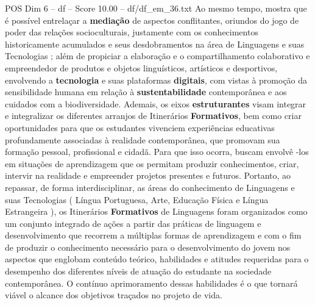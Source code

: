 \begin{textsample}{POS Dim 6 – df – Score 10.00 – df/df\_em\_36.txt}
Ao mesmo tempo, mostra que é possível entrelaçar a \textbf{mediação} de aspectos conflitantes, oriundos do jogo de poder das relações socioculturais, justamente com os conhecimentos historicamente acumulados e seus desdobramentos na área de Linguagens e suas Tecnologias ; além de propiciar a elaboração e o compartilhamento colaborativo e empreendedor de produtos e objetos linguísticos, artísticos e desportivos, envolvendo a \textbf{tecnologia} e suas plataformas \textbf{digitais}, com vistas à promoção da sensibilidade humana em relação à \textbf{sustentabilidade} contemporânea e aos cuidados com a biodiversidade.
Ademais, os eixos \textbf{estruturantes} visam integrar e integralizar os diferentes arranjos de Itinerários \textbf{Formativos}, bem como criar oportunidades para que os estudantes vivenciem experiências educativas profundamente associadas à realidade contemporânea, que promovam sua formação pessoal, profissional e cidadã.
Para que isso ocorra, buscam envolvê -los em situações de aprendizagem que os permitam produzir conhecimentos, criar, intervir na realidade e empreender projetos presentes e futuros.
Portanto, ao repassar, de forma interdisciplinar, as áreas do conhecimento de Linguagens e suas Tecnologias ( Língua Portuguesa, Arte, Educação Física e Língua Estrangeira ), os Itinerários \textbf{Formativos} de Linguagens foram organizados como um conjunto integrado de ações a partir das práticas de linguagem e desenvolvimento que recorrem a múltiplas formas de aprendizagem e com o fim de produzir o conhecimento necessário para o desenvolvimento do jovem nos aspectos que englobam conteúdo teórico, habilidades e atitudes requeridas para o desempenho dos diferentes níveis de atuação do estudante na sociedade contemporânea.
O contínuo aprimoramento dessas habilidades é o que tornará viável o alcance dos objetivos traçados no projeto de vida.

\end{textsample}
